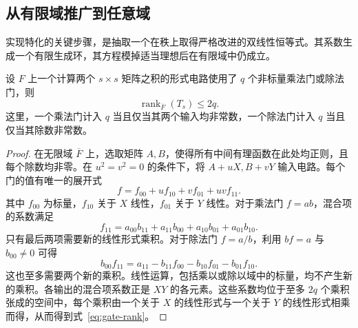 \subsection{从有限域推广到任意域}

实现特化的关键步骤，是抽取一个在秩上取得严格改进的双线性恒等式。其系数生成一个有限生成环，其方程模掉适当理想后在有限域中仍成立。

\begin{lemma}[形式电路的双线性化]\label{lem:bilinearize}
设 \(F\) 上一个计算两个 \(s\times s\) 矩阵之积的形式电路使用了 \(q\) 个非标量乘法门或除法门，则
\begin{equation}\label{eq:gate-rank}
                     \operatorname{rank}_{\overline F}(T_s)\le 2q .
\end{equation}
这里，一个乘法门计入 \(q\) 当且仅当其两个输入均非常数，一个除法门计入 \(q\) 当且仅当其除数非常数。
\end{lemma}
\begin{proof}
在无限域 \(\overline F\) 上，选取矩阵 \(A,B\)，使得所有中间有理函数在此处均正则，且每个除数均非零。在 \(u^2=v^2=0\) 的条件下，将 \(A+uX,B+vY\) 输入电路。每个门的值有唯一的展开式
\[
       f=f_{00}+u f_{10}+v f_{01}+uv f_{11}.
\]
其中 \(f_{00}\) 为标量，\(f_{10}\) 关于 \(X\) 线性，\(f_{01}\) 关于 \(Y\) 线性。对于乘法门 \(f=ab\)，混合项的系数满足
\[
        f_{11}=a_{00}b_{11}+a_{11}b_{00}
                         +a_{10}b_{01}+a_{01}b_{10}.
\]
只有最后两项需要新的线性形式乘积。对于除法门 \(f=a/b\)，利用 \(bf=a\) 与 \(b_{00}\ne0\) 可得
\[
        b_{00} f_{11}=a_{11}-b_{11}f_{00}-b_{10}f_{01}-b_{01}f_{10}.
\]
这也至多需要两个新的乘积。线性运算，包括乘以或除以域中的标量，均不产生新的乘积。各输出的混合项系数正是 \(XY\) 的各元素。这些系数均位于至多 \(2q\) 个乘积张成的空间中，每个乘积由一个关于 \(X\) 的线性形式与一个关于 \(Y\) 的线性形式相乘而得，从而得到式~\eqref{eq:gate-rank}。
\end{proof}

